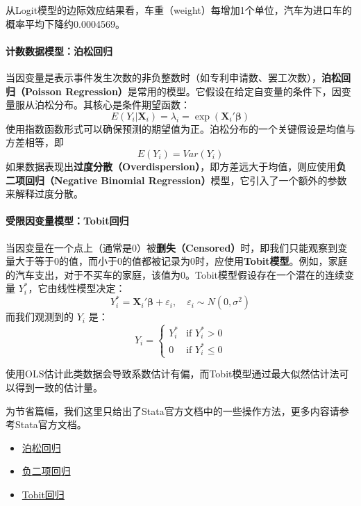 从Logit模型的边际效应结果看，车重（weight）每增加1个单位，汽车为进口车的概率平均下降约0.0004569。

\paragraph*{计数数据模型：泊松回归}
当因变量是表示事件发生次数的非负整数时（如专利申请数、罢工次数），\textbf{泊松回归（Poisson Regression）}是常用的模型。它假设在给定自变量的条件下，因变量服从泊松分布。其核心是条件期望函数：
\begin{equation}
E(Y_i | \mathbf{X}_i) = \lambda_i = \exp(\mathbf{X}_i'\boldsymbol{\beta})
\end{equation}
使用指数函数形式可以确保预测的期望值为正。泊松分布的一个关键假设是均值与方差相等，即
\[
E(Y_i)=Var(Y_i)
\]
如果数据表现出\textbf{过度分散（Overdispersion）}，即方差远大于均值，则应使用\textbf{负二项回归（Negative Binomial Regression）}模型，它引入了一个额外的参数来解释过度分散。

\paragraph*{受限因变量模型：Tobit回归}
当因变量在一个点上（通常是0）被\textbf{删失（Censored）}时，即我们只能观察到变量大于等于0的值，而小于0的值都被记录为0时，应使用\textbf{Tobit模型}。例如，家庭的汽车支出，对于不买车的家庭，该值为0。Tobit模型假设存在一个潜在的连续变量 $Y_i^*$，它由线性模型决定：
\begin{equation}
Y_i^* = \mathbf{X}_i'\boldsymbol{\beta} + \varepsilon_i, \quad \varepsilon_i \sim N(0, \sigma^2)
\end{equation}
而我们观测到的 $Y_i$ 是：
\begin{equation}
Y_i =
\begin{cases}
Y_i^* & \text{if } Y_i^* > 0 \\
0 & \text{if } Y_i^* \leq 0
\end{cases}
\end{equation}

使用OLS估计此类数据会导致系数估计有偏，而Tobit模型通过最大似然估计法可以得到一致的估计量。

为节省篇幅，我们这里只给出了Stata官方文档中的一些操作方法，更多内容请参考Stata官方文档。

\begin{itemize}
	\item \href{https://www.stata.com/manuals13/rpoisson.pdf}{泊松回归}
	\item \href{https://www.stata.com/manuals13/rnbreg.pdf}{负二项回归}
	\item \href{https://www.stata.com/manuals14/rtobit.pdf}{Tobit回归}
\end{itemize}

